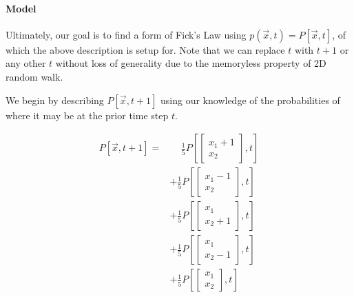 \paragraph{Model}
Ultimately, our goal is to find a form of Fick's Law using $p(\vec{x},t) = P[\vec{x},t]$, of which the above description is setup for. Note that we can replace $t$ with $t+1$ or any other $t$ without loss of generality due to the memoryless property of 2D random walk.

We begin by describing $P[\vec{x},t+1]$ using our knowledge of the probabilities of where it may be at the prior time step $t$.

\begin{align*}
    P\left[\vec{x}, t+1\right] =&\quad\, \frac{1}{5}P\left[\begin{bmatrix} x_1+1\\x_2 \end{bmatrix}, t\right]\\
    &+\frac{1}{5}P\left[\begin{bmatrix} x_1-1\\x_2 \end{bmatrix}, t\right]\\
    &+\frac{1}{5}P\left[\begin{bmatrix} x_1\\x_2+1 \end{bmatrix}, t\right]\\
    &+\frac{1}{5}P\left[\begin{bmatrix} x_1\\x_2-1 \end{bmatrix}, t\right]\\
    &+\frac{1}{5}P\left[\begin{bmatrix} x_1\\x_2 \end{bmatrix}, t\right]
\end{align*}

